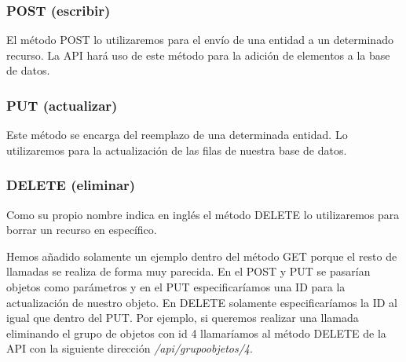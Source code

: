\subsubsection{POST (escribir)}
El método POST lo utilizaremos para el envío de una entidad a un determinado recurso. La API hará uso de este método para la adición de elementos a la base de datos.

\subsubsection{PUT (actualizar)}
Este método se encarga del reemplazo de una determinada entidad. Lo utilizaremos para la actualización de las filas de nuestra base de datos.

\subsubsection{DELETE (eliminar)}
Como su propio nombre indica en inglés el método DELETE lo utilizaremos para borrar un recurso en específico.

\vspace{\baselineskip}
Hemos añadido solamente un ejemplo dentro del método GET porque el resto de llamadas se realiza de forma muy parecida. En el POST y PUT se pasarían objetos como parámetros y en el PUT especificaríamos una ID para la actualización de nuestro objeto. En DELETE solamente especificaríamos la ID al igual que dentro del PUT. Por ejemplo, si queremos realizar una llamada eliminando el grupo de objetos con id 4 llamaríamos al método DELETE de la API con la siguiente dirección \textit{/api/grupoobjetos/4}.

